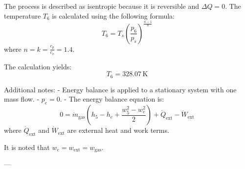 The process is described as isentropic because it is reversible and \( \Delta Q = 0 \). The temperature \( T_6 \) is calculated using the following formula:  
\[
T_6 = T_s \left( \frac{p_6}{p_s} \right)^{\frac{n-1}{n}}
\]
where \( n = k = \frac{c_p}{c_v} = 1.4 \).  

The calculation yields:  
\[
T_6 = 328.07 \, \text{K}
\]

Additional notes:  
- Energy balance is applied to a stationary system with one mass flow.  
- \( p_e = 0 \).  
- The energy balance equation is:  
\[
0 = \dot{m}_{\text{gas}} \left( h_5 - h_e + \frac{w_5^2 - w_e^2}{2} \right) + \dot{Q}_{\text{ext}} - \dot{W}_{\text{ext}}
\]
where \( \dot{Q}_{\text{ext}} \) and \( \dot{W}_{\text{ext}} \) are external heat and work terms.  

It is noted that \( w_e = w_{\text{ext}} = w_{\text{gas}} \).

---